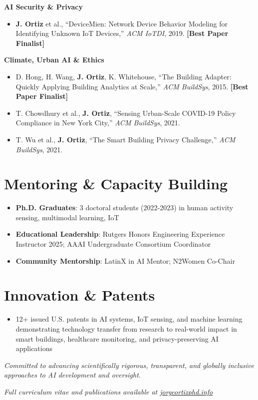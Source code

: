 \documentclass[11pt,letterpaper]{article}
\newcommand{\listentry}[1]{
    \item[\textcolor{accentBlue}{\small\faAngleRight}] #1
}
\begin{document}
\textbf{\color{UNBlue}AI Security \& Privacy}
\begin{itemize}[topsep=0pt]
\listentry{\textbf{J. Ortiz} et al., ``DeviceMien: Network Device Behavior Modeling for Identifying Unknown IoT Devices,'' \textit{ACM IoTDI}, 2019. \textbf{\color{accentBlue}[Best Paper Finalist]}}
\end{itemize}

\textbf{\color{UNBlue}Climate, Urban AI \& Ethics}
\begin{itemize}[topsep=0pt]
\listentry{D. Hong, H. Wang, \textbf{J. Ortiz}, K. Whitehouse, ``The Building Adapter: Quickly Applying Building Analytics at Scale,'' \textit{ACM BuildSys}, 2015. \textbf{\color{accentBlue}[Best Paper Finalist]}}
\listentry{T. Chowdhury et al., \textbf{J. Ortiz}, ``Sensing Urban-Scale COVID-19 Policy Compliance in New York City,'' \textit{ACM BuildSys}, 2021.}
\listentry{T. Wu et al., \textbf{J. Ortiz}, ``The Smart Building Privacy Challenge,'' \textit{ACM BuildSys}, 2021.}
\end{itemize}


\section{Mentoring \& Capacity Building}
\begin{itemize}
\listentry{\textbf{\color{UNBlue}Ph.D. Graduates}: 3 doctoral students (2022-2023) in human activity sensing, multimodal learning, IoT}
\listentry{\textbf{\color{UNBlue}Educational Leadership}: Rutgers Honors Engineering Experience Instructor 2025; AAAI Undergraduate Consortium Coordinator}
\listentry{\textbf{\color{UNBlue}Community Mentorship}: LatinX in AI Mentor; N2Women Co-Chair}
\end{itemize}

\section{Innovation \& Patents}
\begin{itemize}
\listentry{12+ issued U.S. patents in AI systems, IoT sensing, and machine learning demonstrating technology transfer from research to real-world impact in smart buildings, healthcare monitoring, and privacy-preserving AI applications}
\end{itemize}


\vspace{8pt}
\begin{center}
\textit{Committed to advancing scientifically rigorous, transparent, and globally inclusive approaches to AI development and oversight.}
\end{center}

\vspace{4pt}
\begin{center}
\textit{\color{mediumGray}Full curriculum vitae and publications available at \href{http://jorgeortizphd.info}{jorgeortizphd.info}}
\end{center}
\end{document}
